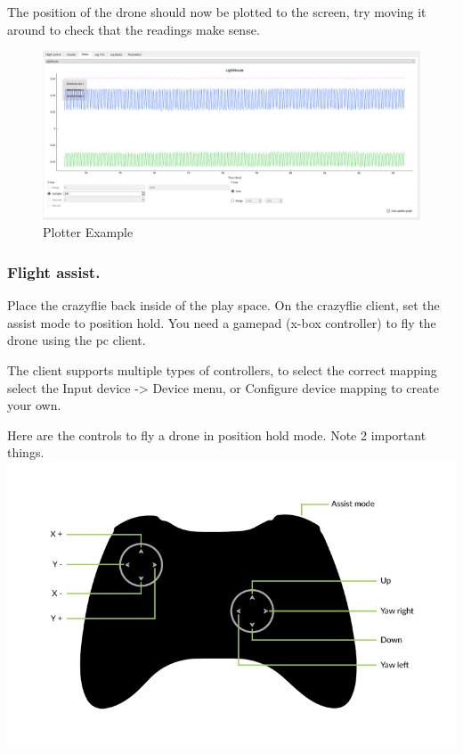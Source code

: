 The position of the drone should now be plotted to the screen, try
moving it around to check that the readings make sense.

\begin{figure}
\centering
\includegraphics{images/plotterExample.png}
\caption{Plotter Example}
\end{figure}

\hypertarget{flight-assist.}{%
\subsubsection{Flight assist.}\label{flight-assist.}}

Place the crazyflie back inside of the play space. On the crazyflie
client, set the assist mode to position hold. You need a gamepad (x-box
controller) to fly the drone using the pc client.

The client supports multiple types of controllers, to select the correct
mapping select the Input device -\textgreater{} Device menu, or
Configure device mapping to create your own.

Here are the controls to fly a drone in position hold mode. Note 2
important things. \includegraphics{images/controls.png}

